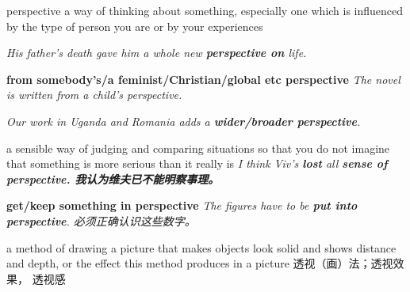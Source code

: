 \begin{DefWord}{perspective}
    a way of thinking about something, especially one which is influenced by the type of person you are or by your experiences

    \textit{His father's death gave him a whole new \textbf{perspective on} life.}
    
    \textbf{from somebody's/a feminist/Christian/global etc perspective}
    \textit{The novel is written from a child's perspective.}

    \textit{Our work in Uganda and Romania adds a \textbf{wider/broader perspective}.}

    a sensible way of judging and comparing situations so that you do not imagine that something is more serious than it really is
    \textit{I think Viv's \textbf{lost} all \textbf{sense of perspective. 我认为维夫已不能明察事理。 }}

    \textbf{get/keep something in perspective}
    \textit{The figures have to be \textbf{put into perspective}. 必须正确认识这些数字。 }

    a method of drawing a picture that makes objects look solid and shows distance and depth, or the effect this method produces in a picture 透视（画）法；透视效果， 透视感
\end{DefWord}

